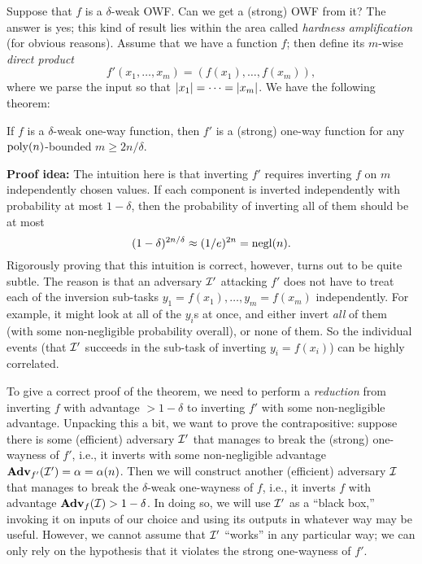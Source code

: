 \documentclass[11pt]{article}
\begin{document}
Suppose that $f$ is a $\delta$-weak OWF.  Can we get a (strong) OWF
from it?  The answer is yes; this kind of result lies within the area
called \emph{hardness amplification} (for obvious reasons).  Assume
that we have a function $f$; then define its $m$-wise \emph{direct
  product} \[ f'(x_{1}, \ldots, x_{m}) = (f(x_{1}), \ldots,
f(x_{m})), \] where we parse the input so that $\lvert x_{1}\rvert = \cdots
= \lvert x_{m}\rvert$.  We have the following theorem:

\begin{theorem}
  \label{thm:weak-strong-owf}
  If $f$ is a $\delta$-weak one-way function, then $f'$ is a (strong)
  one-way function for any $\operatorname{poly}(n)$-bounded $m \geq 2n/\delta$.
\end{theorem}

\textbf{Proof idea:} The intuition here is that inverting $f'$
requires inverting $f$ on $m$ independently chosen values.  If each
component is inverted independently with probability at most
$1-\delta$, then the probability of inverting all of them should be at
most \[ (1-\delta)^{2n/\delta} \approx (1/e)^{2n} = \operatorname{negl}(n). \]
Rigorously proving that this intuition is correct, however, turns out
to be quite subtle.  The reason is that an adversary $\mathcal{I}'$ attacking
$f'$ does not have to treat each of the inversion sub-tasks $y_{1} =
f(x_{1}), \ldots, y_{m} = f(x_{m})$ independently.  For example, it
might look at all of the $y_{i}$s at once, and either invert
\emph{all} of them (with some non-negligible probability overall), or
none of them.  So the individual events (that $\mathcal{I}'$ succeeds in the
sub-task of inverting $y_{i} = f(x_{i})$) can be highly correlated.

To give a correct proof of the theorem, we need to perform a
\emph{reduction} from inverting $f$ with advantage $> 1-\delta$ to
inverting $f'$ with some non-negligible advantage.  Unpacking this a
bit, we want to prove the contrapositive: suppose there is some
(efficient) adversary $\mathcal{I}'$ that manages to break the (strong)
one-wayness of $f'$, i.e., it inverts with some non-negligible
advantage $\mathbf{Adv}_{f'}(\mathcal{I}') = \alpha = \alpha(n)$.  Then we will
construct another (efficient) adversary $\mathcal{I}$ that manages to break
the $\delta$-weak one-wayness of $f$, i.e., it inverts $f$ with
advantage $\mathbf{Adv}_{f}(\mathcal{I}) > 1-\delta$.  In doing so, we will use
$\mathcal{I}'$ as a ``black box,'' invoking it on inputs of our choice and
using its outputs in whatever way may be useful.  However, we cannot
assume that $\mathcal{I}'$ ``works'' in any particular way; we can only rely
on the hypothesis that it violates the strong one-wayness of $f'$.
\end{document}
